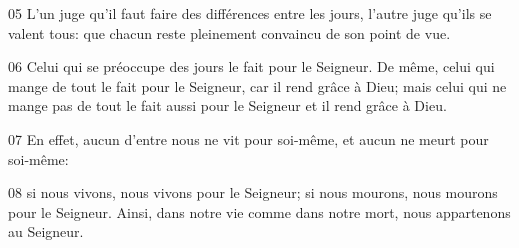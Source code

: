 
05 L’un juge qu’il faut faire des différences entre les jours, l’autre juge qu’ils se valent tous: que chacun reste pleinement convaincu de son point de vue.

06 Celui qui se préoccupe des jours le fait pour le Seigneur. De même, celui qui mange de tout le fait pour le Seigneur, car il rend grâce à Dieu; mais celui qui ne mange pas de tout le fait aussi pour le Seigneur et il rend grâce à Dieu.

07 En effet, aucun d’entre nous ne vit pour soi-même, et aucun ne meurt pour soi-même:

08 si nous vivons, nous vivons pour le Seigneur; si nous mourons, nous mourons pour le Seigneur. Ainsi, dans notre vie comme dans notre mort, nous appartenons au Seigneur.
